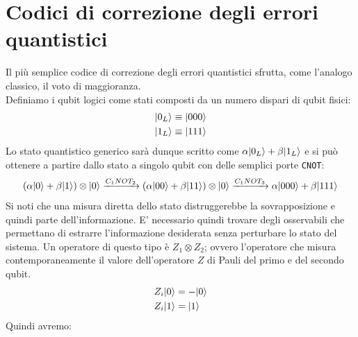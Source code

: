 \documentclass[12pt, a4paper]{report}
\begin{document}
\section{Codici di correzione degli errori quantistici}
Il più semplice codice di correzione degli errori quantistici sfrutta, come l'analogo classico, il voto di maggioranza.\\
Definiamo i qubit logici come stati composti da un numero dispari di qubit fisici:
\begin{equation*}
    \begin{split}
        | 0_{L} \rangle &\equiv | 000 \rangle \\
        | 1_{L} \rangle &\equiv | 111 \rangle
    \end{split}
\end{equation*}
Lo stato quantistico generico sarà dunque scritto come $\alpha| 0_{L} \rangle+\beta| 1_{L} \rangle$ e si può ottenere a partire dallo stato a singolo qubit con delle semplici porte \texttt{CNOT}:
\begin{equation*}
    (\alpha| 0 \rangle+\beta| 1 \rangle)\otimes| 0 \rangle\xrightarrow{C_{1}NOT_{2}}(\alpha| 00 \rangle+\beta| 11 \rangle)\otimes| 0 \rangle\xrightarrow{C_{1}NOT_{3}}\alpha| 000 \rangle+\beta| 111 \rangle
\end{equation*}
Si noti che una misura diretta dello stato distruggerebbe la sovrapposizione e quindi parte dell'informazione. E' necessario quindi trovare degli osservabili che permettano di estrarre l'informazione desiderata senza perturbare  lo stato del sistema. Un operatore di questo tipo è $Z_{1}\otimes Z_{2}$; ovvero l'operatore che misura contemporaneamente il valore dell'operatore $Z$ di Pauli del primo e del secondo qubit. 
\begin{equation*}
    \begin{split}
        Z_{i}| 0 \rangle &= -| 0 \rangle \\
        Z_{i}| 1 \rangle &= | 1 \rangle
    \end{split}
\end{equation*}
Quindi avremo:
\end{document}
